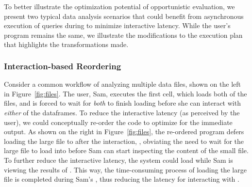 To better illustrate the optimization potential of opportunistic evaluation, we present two typical data analysis scenarios that could benefit from asynchronous execution of queries during \thinktime to minimize interactive latency. 
While the user's program remains the same, we illustrate the modifications to the execution plan that highlights the transformations made. 


\subsubsection{Interaction-based Reordering}
Consider a common workflow of analyzing multiple data files, shown on the left in Figure~\ref{fig:files}.
The user, Sam, executes the first cell, which loads both of the files, and is forced to wait for \emph{both} to finish loading before she can interact with \emph{either} of the dataframes. 
To reduce the interactive latency (as perceived by the user), we could conceptually re-order the code to optimize for the immediate output.  As shown on the right in Figure~\ref{fig:files}, the re-ordered program defers loading the large file to after the interaction, , obviating the need to wait for the large file to load into  before Sam can start inspecting the content of the small file.
To further reduce the interactive latency, the system could load  while Sam is viewing the results of . This way, the time-consuming process of loading the large file is completed during Sam's \thinktime, thus reducing the latency for interacting with .

